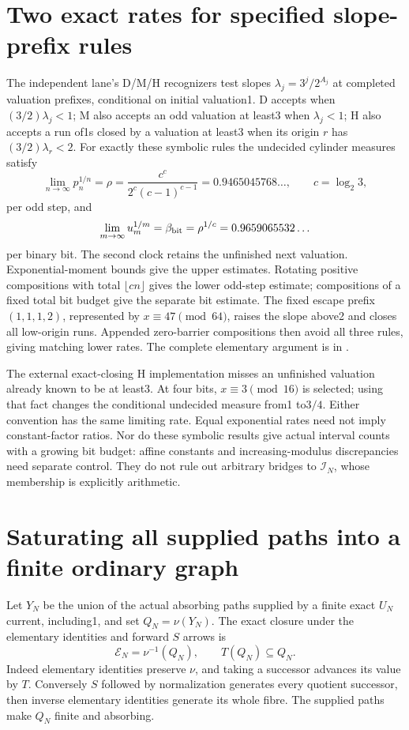 \documentclass[11pt]{article}
\begin{document}
\section{Two exact rates for specified slope-prefix rules}
The independent lane's D/M/H recognizers test slopes
$\lambda_j=3^j/2^{A_j}$ at completed valuation prefixes, conditional
on initial valuation1. D accepts when $(3/2)\lambda_j<1$;
M also accepts an odd valuation at least3 when $\lambda_j<1$;
H also accepts a run of1s closed by a valuation at least3 when its
origin $r$ has $(3/2)\lambda_r<2$.
For exactly these symbolic rules the undecided cylinder measures satisfy
\[
\lim_{n\to\infty}p_n^{1/n}=\rho
=\frac{c^c}{2^c(c-1)^{c-1}}=0.9465045768\ldots,
\qquad c=\log_2 3,
\]
per odd step, and
\[
\lim_{m\to\infty}u_m^{1/m}=\beta_{\rm bit}
=\rho^{1/c}=0.9659065532\ldots
\]
per binary bit. The second clock retains the unfinished next valuation.
Exponential-moment bounds give the upper estimates. Rotating positive
compositions with total $\lfloor cn\rfloor$ gives the lower odd-step
estimate; compositions of a fixed total bit budget give the separate bit
estimate. The fixed escape prefix $(1,1,1,2)$, represented by
$x\equiv47\pmod{64}$, raises the slope above2 and closes all low-origin
runs. Appended zero-barrier compositions then avoid all three rules,
giving matching lower rates. The complete elementary argument is in
.

The external exact-closing H implementation misses an unfinished
valuation already known to be at least3. At four bits,
$x\equiv3\pmod{16}$ is selected; using that fact changes the conditional
undecided measure from1 to$3/4$. Either convention has the same limiting
rate. Equal exponential rates need not imply constant-factor ratios.
Nor do these symbolic results give actual interval counts with a growing
bit budget: affine constants and increasing-modulus discrepancies need
separate control. They do not rule out arbitrary bridges to
$\mathcal I_N$, whose membership is explicitly arithmetic.

\section{Saturating all supplied paths into a finite ordinary graph}
Let $Y_N$ be the union of the actual absorbing paths supplied by a finite
exact $U_N$ current, including1, and set $Q_N=\nu(Y_N)$.
The exact closure under the elementary identities and forward $S$ arrows is
\[
\mathcal E_N=\nu^{-1}(Q_N),\qquad T(Q_N)\subseteq Q_N.
\]
Indeed elementary identities preserve $\nu$, and taking a successor
advances its value by $T$. Conversely $S$ followed by normalization
generates every quotient successor, then inverse elementary identities
generate its whole fibre. The supplied paths make $Q_N$ finite and absorbing.
\end{document}
